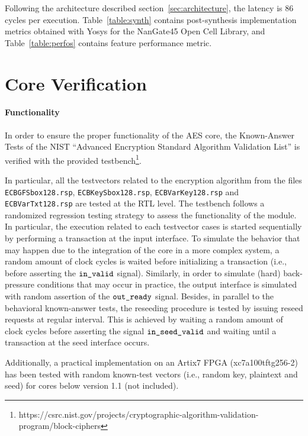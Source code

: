 \documentclass{scrartcl}
\begin{document}

Following the architecture described section~\ref{sec:architecture}, the latency is
$86$ cycles per execution. Table~\ref{table:synth} contains post-synthesis implementation metrics
obtained with Yosys for the NanGate45 Open Cell Library, and Table~\ref{table:perfos} contains feature performance metric.

\section{Core Verification}
\label{section:verif}
\paragraph{Functionality}
In order to ensure the proper functionality of the AES core, the Known-Answer
Tests of the NIST ``Advanced Encryption Standard Algorithm Validation List'' is
verified with the provided
testbench\footnote{https://csrc.nist.gov/projects/cryptographic-algorithm-validation-program/block-ciphers}.

In particular, all the testvectors related to the
encryption algorithm from the files \texttt{ECBGFSbox128.rsp},
\texttt{ECBKeySbox128.rsp}, \texttt{ECBVarKey128.rsp} and
\texttt{ECBVarTxt128.rsp} are tested at the RTL level. The
testbench follows a randomized regression testing strategy to assess the
functionality of the module. In particular, the execution related to each
testvector cases is started sequentially by performing a transaction
at the input interface.  To simulate the behavior that may happen due to the
integration of the core in a more complex system, a random amount of clock
cycles is waited before initializing a transaction (i.e., before asserting the
$\texttt{in\_valid}$ signal). Similarly, in order to simulate (hard) back-pressure conditions that may occur
in practice, the output interface is simulated with random
assertion of the $\texttt{out\_ready}$ signal. Besides, in
parallel to the behavioral known-answer tests, the reseeding procedure is
tested by issuing reseed requests at regular interval. This is achieved by 
waiting a random amount of clock cycles before asserting the signal
$\texttt{in\_seed\_valid}$ and waiting until a transaction at the seed interface occurs.

Additionally, a practical implementation on an Artix7 FPGA (xc7a100tftg256-2)
has been tested with random known-test vectors (i.e., random key, plaintext and seed) for cores below version 1.1 (not included).  
\end{document}
